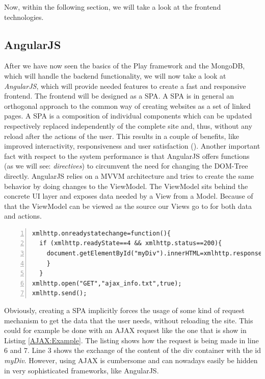 Now, within the following section, we will take a look at the frontend technologies.
\subsection{AngularJS}
\label{AngularJS}
After we have now seen the basics of the Play framework and the MongoDB, which will handle the backend functionality, we will now take a look at \textit{AngularJS}, which will provide needed features to create a fast and responsive frontend. The frontend will be designed as a \ac{SPA}. A \ac{SPA} is in general an orthogonal approach to the common way of creating websites as a set of linked pages. A \ac{SPA} is a composition of individual components which can be updated respectively replaced independently of the complete site and, thus, without any reload after the actions of the user. This results in a couple of benefits, like improved interactivity, responsiveness and user satisfaction (\cite{Mes07}). Another important fact with respect to the system performance is that AngularJS offers functions (as we will see: \emph{directives}) to circumvent the need for changing the \ac{DOM}-Tree directly. AngularJS relies on a \ac{MVVM} architecture and tries to create the same behavior by doing changes to the ViewModel. The ViewModel sits behind the concrete \ac{UI} layer and exposes data needed by a View from a Model. Because of that the ViewModel can be viewed as the source our Views go to for both data and actions. 

\begin{lstlisting}[numbers=left,caption={Simple example that shows the use of an AJAX request that shows the reponse text within a specific div container},label=AJAX:Example,frame=tlbr,breaklines]
xmlhttp.onreadystatechange=function(){
  if (xmlhttp.readyState==4 && xmlhttp.status==200){
    document.getElementById("myDiv").innerHTML=xmlhttp.responseText;
    }
  }
xmlhttp.open("GET","ajax_info.txt",true);
xmlhttp.send();
\end{lstlisting}

Obviously, creating a \ac{SPA} implicitly forces the usage of some kind of request mechanism to get the data that the user needs, without reloading the site. This could for example be done with an \ac{AJAX} request like the one that is show in Listing \ref{AJAX:Example}. The listing shows how the request is being made in line 6 and 7. Line 3 shows the exchange of the content of the div container with the id \textit{myDiv}. However, using \ac{AJAX} is cumbersome and can nowadays easily be hidden in very sophisticated frameworks, like AngularJS.

